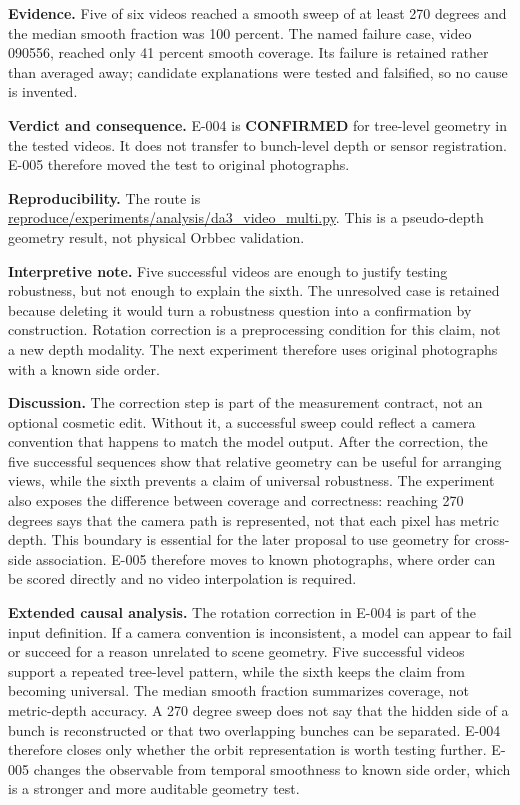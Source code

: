 \documentclass[preprint,12pt]{elsarticle}
\newcommand{\pathcode}[1]{\scriptsize\url{#1}}
\begin{document}
\textbf{Evidence.} Five of six videos reached a smooth sweep of at least
270 degrees and the median smooth fraction was 100 percent. The named failure
case, video 090556, reached only 41 percent smooth coverage. Its failure is
retained rather than averaged away; candidate explanations were tested and
falsified, so no cause is invented.

\textbf{Verdict and consequence.} E-004 is \textbf{CONFIRMED} for tree-level
geometry in the tested videos. It does not transfer to bunch-level depth or
sensor registration. E-005 therefore moved the test to original photographs.

\textbf{Reproducibility.} The route is
\pathcode{reproduce/experiments/analysis/da3_video_multi.py}. This is a
pseudo-depth geometry result, not physical Orbbec validation.

\textbf{Interpretive note.} Five successful videos are enough to justify
testing robustness, but not enough to explain the sixth. The unresolved case
is retained because deleting it would turn a robustness question into a
confirmation by construction. Rotation correction is a preprocessing
condition for this claim, not a new depth modality. The next experiment
therefore uses original photographs with a known side order.

\textbf{Discussion.} The correction step is part of the measurement contract,
not an optional cosmetic edit. Without it, a successful sweep could
reflect a camera convention that happens to match the model output. After the
correction, the five successful sequences show that relative geometry can be
useful for arranging views, while the sixth prevents a claim of universal
robustness. The experiment also exposes the difference between coverage and
correctness: reaching 270 degrees says that the camera path is represented,
not that each pixel has metric depth. This boundary is essential for the
later proposal to use geometry for cross-side association. E-005 therefore
moves to known photographs, where order can be scored directly and no video
interpolation is required.

\textbf{Extended causal analysis.} The rotation correction in E-004 is part
of the input definition. If a camera convention is inconsistent, a model can
appear to fail or succeed for a reason unrelated to scene geometry. Five
successful videos support a repeated tree-level pattern, while the sixth keeps
the claim from becoming universal. The median smooth fraction summarizes
coverage, not metric-depth accuracy. A 270 degree sweep does not say that the
hidden side of a bunch is reconstructed or that two overlapping bunches can be
separated. E-004 therefore closes only whether the orbit representation is
worth testing further. E-005 changes the observable from temporal smoothness
to known side order, which is a stronger and more auditable geometry test.
\end{document}
